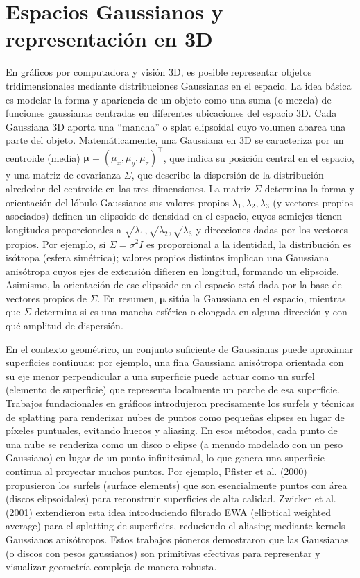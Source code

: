 \section{Espacios Gaussianos y representación en 3D}
En gráficos por computadora y visión 3D, es posible representar objetos tridimensionales mediante distribuciones Gaussianas en el espacio. 
La idea básica es modelar la forma y apariencia de un objeto como una suma (o mezcla) de funciones gaussianas centradas en diferentes ubicaciones 
del espacio 3D. Cada Gaussiana 3D aporta una “mancha” o splat elipsoidal cuyo volumen abarca una parte del objeto. Matemáticamente, una Gaussiana en 
3D se caracteriza por un centroide (media) $\boldsymbol{\mu} = (\mu_x,\mu_y,\mu_z)^\top$, que indica su posición central en el espacio, y una matriz de 
covarianza $\Sigma$, que describe la dispersión de la distribución alrededor del centroide en las tres dimensiones. La matriz $\Sigma$ determina la forma 
y orientación del lóbulo Gaussiano: sus valores propios $\lambda_1,\lambda_2,\lambda_3$ (y vectores propios asociados) definen un elipsoide de densidad 
en el espacio, cuyos semiejes tienen longitudes proporcionales a $\sqrt{\lambda_1}, \sqrt{\lambda_2}, \sqrt{\lambda_3}$ y direcciones dadas por los 
vectores propios. Por ejemplo, si $\Sigma = \sigma^2 I$ es proporcional a la identidad, la distribución es isótropa (esfera simétrica); 
valores propios distintos implican una Gaussiana anisótropa cuyos ejes de extensión difieren en longitud, formando un elipsoide. Asimismo, 
la orientación de ese elipsoide en el espacio está dada por la base de vectores propios de $\Sigma$. En resumen, $\boldsymbol{\mu}$ sitúa la Gaussiana 
en el espacio, mientras que $\Sigma$ determina si es una mancha esférica o elongada en alguna dirección y con qué amplitud de dispersión.

En el contexto geométrico, un conjunto suficiente de Gaussianas puede 
aproximar superficies continuas: por ejemplo, una fina Gaussiana anisótropa orientada con su eje menor perpendicular a una superficie puede actuar 
como un surfel (elemento de superficie) que representa localmente un parche de esa superficie. Trabajos fundacionales en gráficos introdujeron 
precisamente los surfels y técnicas de splatting para renderizar nubes de puntos como pequeñas elipses en lugar de píxeles puntuales, evitando 
huecos y aliasing. En esos métodos, cada punto de una nube se renderiza como un disco o elipse (a menudo modelado con un peso Gaussiano) en lugar 
de un punto infinitesimal, lo que genera una superficie continua al proyectar muchos puntos. Por ejemplo, Pfister et al. (2000) propusieron los surfels 
(surface elements) que son esencialmente puntos con área (discos elipsoidales) para reconstruir superficies de alta calidad. Zwicker et al. (2001) 
extendieron esta idea introduciendo filtrado EWA (elliptical weighted average) para el splatting de superficies, reduciendo el aliasing mediante kernels 
Gaussianos anisótropos. Estos trabajos pioneros demostraron que las Gaussianas (o discos con pesos gaussianos) son primitivas efectivas para representar 
y visualizar geometría compleja de manera robusta.

